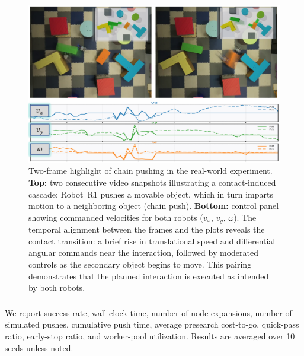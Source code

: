 \begin{figure}
  \centering
  \includegraphics[width=1\linewidth]{figures/hardware_snap.png}
  \vspace{-2mm}
\caption{Two-frame highlight of chain pushing in the real-world experiment. \textbf{Top:} two consecutive video snapshots illustrating a contact-induced cascade: Robot~R1 pushes a movable object, which in turn imparts motion to a neighboring object (chain push). \textbf{Bottom:} control panel showing commanded velocities for both robots (\(v_x\), \(v_y\), \(\omega\)). The temporal alignment between the frames and the plots reveals the contact transition: a brief rise in translational speed and differential angular commands near the interaction, followed by moderated controls as the secondary object begins to move. This pairing demonstrates that the planned interaction is executed as intended by both robots.}
\end{figure}

\subsubsection{}
\label{subsec:metrics}
We report success rate, wall-clock time, number of node expansions,
number of simulated pushes, cumulative push time, average presearch
cost-to-go, quick-pass ratio, early-stop ratio, and worker-pool
utilization. Results are averaged over 10 seeds unless noted.

